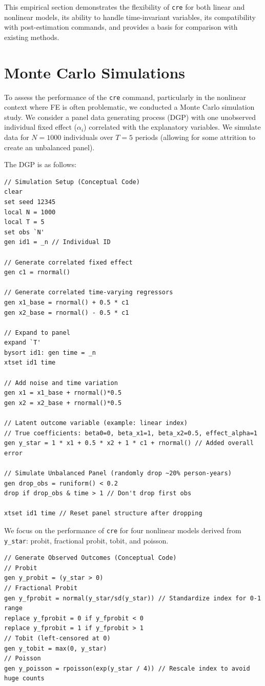 \documentclass[bib]{statapress}
\begin{document}
This empirical section demonstrates the flexibility of \texttt{cre} for
both linear and nonlinear models, its ability to handle time-invariant
variables, its compatibility with post-estimation commands, and provides
a basis for comparison with existing methods.

\section{Monte Carlo Simulations}\label{sec-5}

To assess the performance of the \texttt{cre} command, particularly in
the nonlinear context where FE is often problematic, we conducted a
Monte Carlo simulation study. We consider a panel data generating
process (DGP) with one unobserved individual fixed effect (\(\alpha_i\))
correlated with the explanatory variables. We simulate data for
\(N=1000\) individuals over \(T=5\) periods (allowing for some attrition
to create an unbalanced panel).

The DGP is as follows:

\begin{verbatim}
// Simulation Setup (Conceptual Code)
clear
set seed 12345
local N = 1000
local T = 5
set obs `N'
gen id1 = _n // Individual ID

// Generate correlated fixed effect
gen c1 = rnormal()

// Generate correlated time-varying regressors
gen x1_base = rnormal() + 0.5 * c1
gen x2_base = rnormal() - 0.5 * c1

// Expand to panel
expand `T'
bysort id1: gen time = _n
xtset id1 time

// Add noise and time variation
gen x1 = x1_base + rnormal()*0.5
gen x2 = x2_base + rnormal()*0.5

// Latent outcome variable (example: linear index)
// True coefficients: beta0=0, beta_x1=1, beta_x2=0.5, effect_alpha=1
gen y_star = 1 * x1 + 0.5 * x2 + 1 * c1 + rnormal() // Added overall error

// Simulate Unbalanced Panel (randomly drop ~20% person-years)
gen drop_obs = runiform() < 0.2
drop if drop_obs & time > 1 // Don't drop first obs

xtset id1 time // Reset panel structure after dropping
\end{verbatim}

We focus on the performance of \texttt{cre} for four nonlinear models
derived from \texttt{y\_star}: probit, fractional probit, tobit, and
poisson.

\begin{verbatim}
// Generate Observed Outcomes (Conceptual Code)
// Probit
gen y_probit = (y_star > 0)
// Fractional Probit
gen y_fprobit = normal(y_star/sd(y_star)) // Standardize index for 0-1 range
replace y_fprobit = 0 if y_fprobit < 0
replace y_fprobit = 1 if y_fprobit > 1
// Tobit (left-censored at 0)
gen y_tobit = max(0, y_star)
// Poisson
gen y_poisson = rpoisson(exp(y_star / 4)) // Rescale index to avoid huge counts
\end{verbatim}
\end{document}

